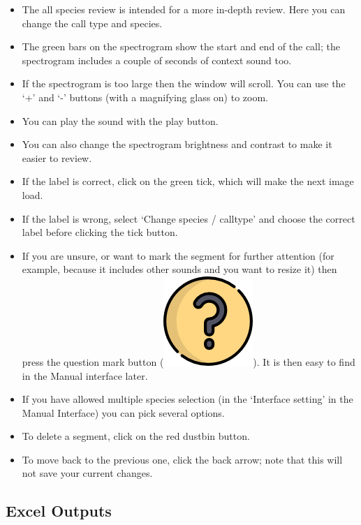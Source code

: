 \documentclass{article}
\begin{document}
\begin{itemize}
\item The all species review is intended for a more in-depth review. Here you can change the call type and species.
\item The green bars on the spectrogram show the start and end of the call; the spectrogram includes a couple of seconds of context sound too. 
\item If the spectrogram is too large then the window will scroll. You can use the `+' and `-' buttons (with a magnifying glass on) to zoom. 
\item You can play the sound with the play button. 
\item You can also change the spectrogram brightness and contrast to make it easier to review. 
\item If the label is correct, click on the green tick, which will make the next image load. 
\item If the label is wrong, select `Change species / calltype' and choose the correct label before clicking the tick button.
\item If you are unsure, or want to mark the segment for further attention (for example, because it includes other sounds and you want to resize it) then press the question mark button (\includegraphics[scale=0.03]{Figures/questionL}). It is then easy to find in the Manual interface later.
\item If you have allowed multiple species selection (in the `Interface setting' in the Manual Interface) you can pick several options. 
\item To delete a segment, click on the red dustbin button. 
\item To move back to the previous one, click the back arrow; note that this will not save your current changes. 
\end{itemize}


\subsection{Excel Outputs}
\label{sec:outputs}
\end{document}
